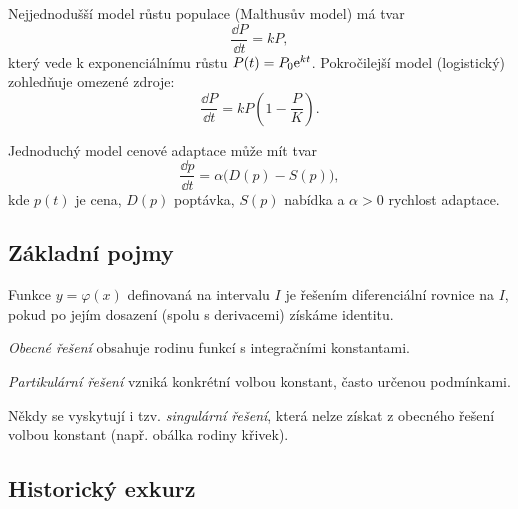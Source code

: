 \begin{example}
Nejjednodušší model růstu populace (Malthusův model) má tvar
\[
\frac{\dd P}{\dd t} = k P,
\]
který vede k exponenciálnímu růstu $P(t) = P_0 \mathrm{e}^{kt}$. 
Pokročilejší model (logistický) zohledňuje omezené zdroje:
\[
\frac{\dd P}{\dd t} = k P \left(1 - \frac{P}{K}\right).
\]
\end{example}

\begin{example}[Ekonomie]
Jednoduchý model cenové adaptace může mít tvar
\[
\frac{\dd p}{\dd t} = \alpha \big(D(p) - S(p)\big),
\]
kde $p(t)$ je cena, $D(p)$ poptávka, $S(p)$ nabídka a $\alpha > 0$ rychlost adaptace.
\end{example}

\spc

\subsection{Základní pojmy}

\begin{definition} Funkce $y=\varphi(x)$ definovaná na intervalu $I$ je řešením diferenciální rovnice na $I$, pokud po jejím dosazení (spolu s derivacemi) získáme identitu. \end{definition}
    

\begin{definition}
    \begin{romanenum}
    \item \emph{Obecné řešení} obsahuje rodinu funkcí s integračními konstantami.
    \item \emph{Partikulární řešení} vzniká konkrétní volbou konstant, často určenou podmínkami.
    \end{romanenum}
    \end{definition}
    

\begin{remark}
Někdy se vyskytují i tzv. \emph{singulární řešení}, která nelze získat z obecného řešení volbou konstant (např. obálka rodiny křivek).
\end{remark}

\spc

\subsection{Historický exkurz}

